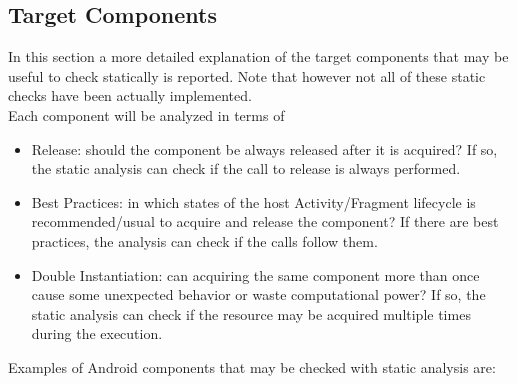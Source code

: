 \documentclass[11pt,a4paper,notitlepage]{article}
\begin{document}
\subsection{Target Components}
In this section a more detailed explanation of the target components that may be useful to check statically is reported. Note that however not all of these static checks have been actually implemented.\bigskip \\
Each component will be analyzed in terms of
\begin{itemize}
	\item Release: should the component be always released after it is acquired? If so, the static analysis can check if the call to release is always performed.
	\item Best Practices: in which states of the host Activity/Fragment lifecycle is recommended/usual to acquire and release the component? If there are best practices, the analysis can check if the calls follow them.
	\item Double Instantiation: can acquiring the same component more than once cause some unexpected behavior or waste computational power? If so, the static analysis can check if the resource may be acquired multiple times during the execution.
\end{itemize}\medskip
Examples of Android components that may be checked with static analysis are:
\end{document}
